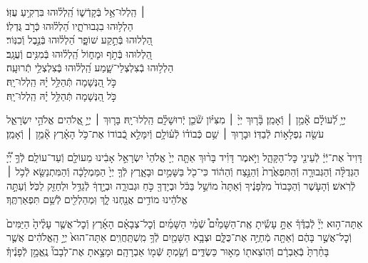 \documentclass[twoside, openany, parskip=half, 11pt]{book}
\begin{document}
\begin{narrow}
 ׀ \hfill \break
הַֽלְלוּ־אֵ֥ל בְּֿקָדְֿשׁ֑וֹ \hfill הַֽ֝לְל֗וּהוּ בִּרְקִ֥יעַ עֻזּֽוֹ׃ \\
הַלְל֥וּהוּ בִגְבוּרֹתָ֑יו \hfill הַ֝לְל֗וּהוּ כְּֿרֹ֣ב גֻּדְלֽוֹ׃ \\
הַ֭לְלוּהוּ בְּֿתֵ֣קַע שׁוֹפָ֑ר \hfill הַ֝לְל֗וּהוּ בְּֿנֵ֣בֶל וְֿכִנּֽוֹר׃ \\
הַ֭לְלוּהוּ בְּֿתֹ֣ף וּמָח֑וֹל \hfill הַֽ֝לְל֗וּהוּ בְּֿמִנִּ֥ים וְֿעֻגָֽב׃ \\
הַלְל֥וּהוּ בְֿצִלְצְלֵי־שָׁ֑מַע \hfill הַֽ֝לְל֗וּהוּ בְּֽֿצִלְצְלֵ֥י תְֿרוּעָֽה׃ \\
כֹּ֣ל הַ֭נְּשָׁמָה תְּֿהַלֵּ֥ל יָ֗הּ \hfill הַֽלְלוּ־יָֽהּ׃ \\
\scriptsize{כֹּ֣ל הַ֭נְּשָׁמָה תְּֿהַלֵּ֥ל יָ֗הּ \hfill הַֽלְלוּ־יָֽהּ׃ \\}
\normalsize{}

\end{narrow}

\negline

יְיָ֥ לְֿ֝עוֹלָ֗ם אָ֘מֵ֥ן ׀ וְֿאָמֵֽן׃ \hfill \break
{}בָּ֘ר֤וּךְ יְיָ֨ ׀ מִצִּיּ֗וֹן שֹׁ֘כֵ֤ן יְֽֿרוּשָׁלָ֗‍ִם הַֽלְלוּ־יָֽהּ׃ \hfill \break
{}בָּר֤וּךְ ׀ יְיָ֣ אֱ֭לֹהִים אֱלֹהֵ֣י יִשְׂרָאֵ֑ל עֹשֵׂ֖ה נִפְלָא֣וֹת לְֿבַדּֽוֹ׃ \hfill \break
וּבָר֤וּךְ ׀ שֵׁ֥ם כְּֿבוֹד֗וֹ לְֿע֫וֹלָ֥ם וְֿיִמָּלֵ֣א כְֿ֭בוֹדוֹ אֶת־כֹּ֥ל הָאָ֗רֶץ אָ֘מֵ֥ן ׀ וְֿאָמֵֽן׃





דָּוִיד֙ אֶת־יְֿיָ֔ לְֿעֵינֵ֖י כׇּל־הַקָּהָ֑ל וַיֹּ֣אמֶר דָּוִ֗יד בָּר֨וּךְ אַתָּ֤ה יְיָ֙ אֱלֹהֵי֙ יִשְׂרָאֵ֣ל אָבִ֔ינוּ מֵעוֹלָ֖ם וְֿעַד־עוֹלָֽם׃
לְֿךָ֣ יְ֠יָ֠ הַגְּדֻלָּ֨ה וְֿהַגְּבוּרָ֤ה וְֿהַתִּפְאֶ֙רֶת֙ וְֿהַנֵּ֣צַח וְֿהַה֔וֹד כִּי־כֹ֖ל בַּשָּׁמַ֣יִם וּבָאָ֑רֶץ לְֿךָ֤ יְיָ֙ הַמַּמְלָכָ֔ה וְֿהַמִּתְנַשֵּׂ֖א לְֿכֹ֥ל ׀ לְֿרֹֽאשׁ׃
וְֿהָעֹ֤שֶׁר וְֿהַכָּבוֹד֙ מִלְּפָנֶ֔יךָ וְֿאַתָּה֙ מוֹשֵׁ֣ל בַּכֹּ֔ל וּבְיָדְךָ֖ כֹּ֣חַ וּגְבוּרָ֑ה וּבְיָ֣דְךָ֔ לְֿגַדֵּ֥ל וּלְחַזֵּ֖ק לַכֹּֽל׃
וְֿעַתָּ֣ה אֱלֹהֵ֔ינוּ מוֹדִ֥ים אֲנַ֖חְנוּ לָ֑ךְ וּֽמְהַלְלִ֖ים לְֿשֵׁ֥ם תִּפְאַרְתֶּֽךָ׃



אַתָּה־ה֣וּא
יְיָ֘ לְֿבַדֶּ֒ךָ֒ אַתָּ֣ עָשִֽׂ֡יתָ אֶֽת־הַשָּׁמַ֩יִם֩ שְֿׁמֵ֨י הַשָּׁמַ֜יִם וְֿכׇל־צְבָאָ֗ם הָאָ֜רֶץ וְֿכׇל־אֲשֶׁ֤ר עָלֶ֨יהָ֙ הַיַּמִּים֙ וְֿכׇל־אֲשֶׁ֣ר בָּהֶ֔ם וְֿאַתָּ֖ה מְֿחַיֶּ֣ה אֶת־כֻּלָּ֑ם וּצְבָ֥א הַשָּׁמַ֖יִם לְֿךָ֥ מִֽשְׁתַּֽחֲוִֽים׃
אַתָּה־הוּא֙ יְיָ֣ הָֽאֱלֹהִ֔ים אֲשֶׁ֤ר בָּחַ֨רְתָּ֙ בְּֿאַבְרָ֔ם וְֿהֽוֹצֵאת֖וֹ מֵא֣וּר כַּשְׂדִּ֑ים וְֿשַׂ֥מְתָּ שְּֿׁמ֖וֹ אַבְרָהָֽם׃ וּמָצָ֣אתָ אֶת־לְבָבוֹ֘ נֶֽאֱמָ֣ן לְֿפָנֶ֒יךָ֒׃
\end{document}
